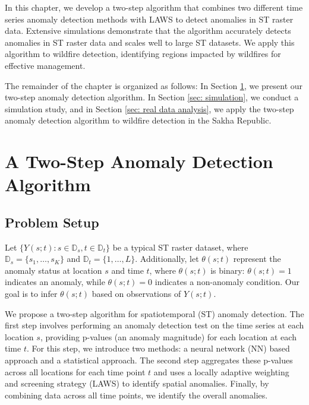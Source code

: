 \documentclass[11pt]{article}
\begin{document}
In this chapter, we develop a two-step algorithm that combines two different time series anomaly detection methods with LAWS to detect anomalies in ST raster data. Extensive simulations demonstrate that the algorithm accurately detects anomalies in ST raster data and scales well to large ST datasets. We apply this algorithm to wildfire detection, identifying regions impacted by wildfires for effective management.



The remainder of the chapter is organized as follows:
In Section \ref{sec: spatiotemporal anomaly detection}, we present our two-step anomaly detection algorithm.
In Section \ref{sec: simulation}, we conduct a simulation study, and in Section \ref{sec: real data analysis}, we apply the two-step anomaly detection algorithm to wildfire detection in the Sakha Republic.



\section{A Two-Step Anomaly Detection Algorithm}\label{sec: spatiotemporal anomaly detection}

\subsection{Problem Setup}
Let $\{Y(s;t): s \in \mathbb{D}_s, t \in \mathbb{D}_t\}$ be a typical ST raster dataset, where $\mathbb{D}_s = \{s_1, \ldots, s_K\}$ and $\mathbb{D}_t = \{1,\ldots, L\}$. Additionally, let $\theta(s;t)$ represent the anomaly status at location $s$ and time $t$, where $\theta(s;t)$ is binary: $\theta(s;t) = 1$ indicates an anomaly, while $\theta(s;t) = 0$ indicates a non-anomaly condition. Our goal is to infer $\theta(s;t)$ based on observations of $Y(s;t)$.



We propose a two-step algorithm for spatiotemporal (ST) anomaly detection. The first step involves performing an anomaly detection test on the time series at each location $s$, providing p-values (an anomaly magnitude) for each location at each time $t$. For this step, we introduce two methods: a neural network (NN) based approach and a statistical approach. The second step aggregates these p-values across all locations for each time point $t$ and uses a locally adaptive weighting and screening strategy (LAWS) to identify spatial anomalies. Finally, by combining data across all time points, we identify the overall anomalies. 
\end{document}
